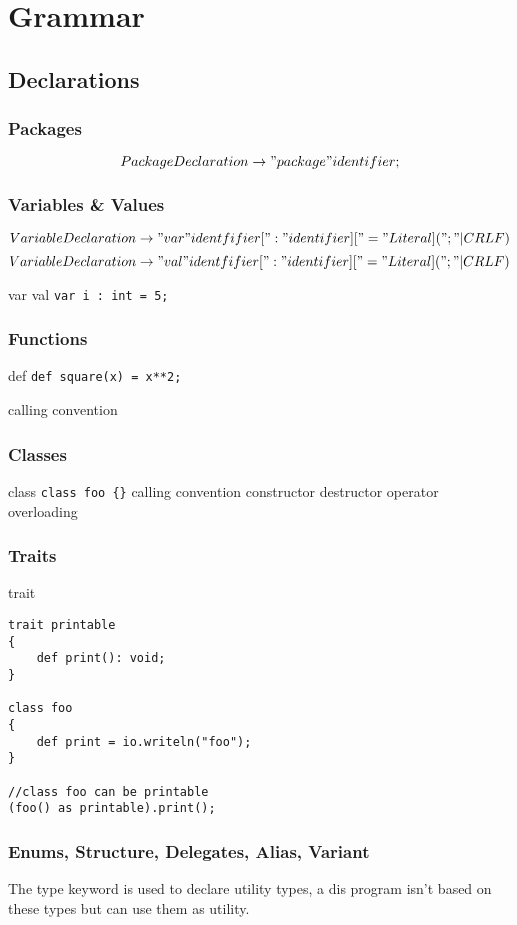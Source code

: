 \documentclass[a4paper]{article}
\begin{document}
\section{Grammar}

\subsection{Declarations}

\subsubsection*{Packages}
\[PackageDeclaration \rightarrow "package" identifier;\]

\subsubsection*{Variables \& Values}
\[VariableDeclaration \rightarrow "var" identfifier [":" identifier] ["=" Literal] (";" | CRLF)\]
\[VariableDeclaration \rightarrow "val" identfifier [":" identifier] ["=" Literal] (";" | CRLF)\]

var val
\lstinline!var i : int = 5;!

\subsubsection*{Functions}
def
\lstinline!def square(x) = x**2;!

calling convention

\subsubsection*{Classes}
class
\lstinline!class foo {}!
calling convention
constructor
destructor
operator overloading

\subsubsection*{Traits}
trait
\begin{lstlisting}
trait printable
{
	def print(): void;
}

class foo
{
	def print = io.writeln("foo");
}

//class foo can be printable
(foo() as printable).print();
\end{lstlisting}

\subsubsection*{Enums, Structure, Delegates, Alias, Variant}
The type keyword is used to declare utility types, a dis program isn't based on these types but can use them as utility.
\end{document}
